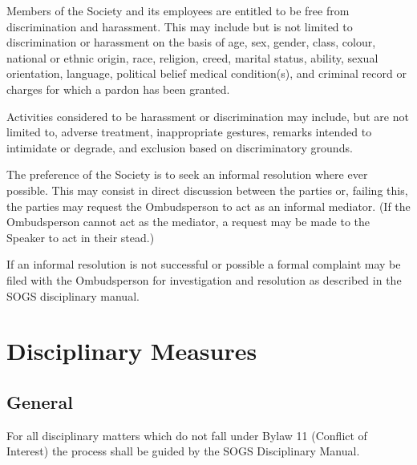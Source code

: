 \begin{longenum}[ label*=\thesection.\arabic*., align=left]
	\item Members of the Society and its employees are entitled to be free from discrimination and harassment. This may include but is not limited to discrimination or harassment on the basis of age, sex, gender, class, colour, national or ethnic origin, race, religion, creed, marital status, ability, sexual orientation, language, political belief medical condition(s), and criminal record or charges for 
which a pardon has been granted.


\item Activities considered to be harassment or discrimination may include, but are not limited to, adverse treatment, inappropriate gestures, remarks intended to intimidate or degrade, and exclusion based on discriminatory grounds.



\item The preference of the Society is to seek an informal resolution where ever possible. This may consist in direct discussion between the parties or, failing this, the parties may request the Ombudsperson to act as an informal mediator. (If the Ombudsperson cannot act as the mediator, a request may be made to the Speaker to act in their stead.)

\item If an informal resolution is not successful or possible a formal complaint may be filed with the Ombudsperson for investigation and resolution as described in the SOGS disciplinary manual.

\end{longenum}

\newpage

\section{Disciplinary Measures}
\subsection {General}
\begin{longenum}[ label*=\thesubsection.\arabic*., align=left] 
\item For all disciplinary matters which do not fall under Bylaw 11 (Conflict of Interest) the process shall be guided by the SOGS Disciplinary Manual.
\end{longenum}
